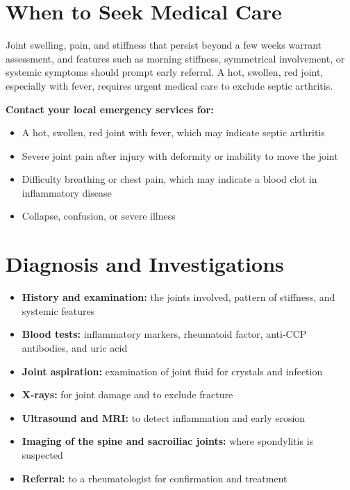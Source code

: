 \section*{When to Seek Medical Care}
Joint swelling, pain, and stiffness that persist beyond a few weeks warrant assessment, and features such as morning stiffness, symmetrical involvement, or systemic symptoms should prompt early referral. A hot, swollen, red joint, especially with fever, requires urgent medical care to exclude septic arthritis.

\textbf{Contact your local emergency services for:}
\begin{itemize}
    \item A hot, swollen, red joint with fever, which may indicate septic arthritis
    \item Severe joint pain after injury with deformity or inability to move the joint
    \item Difficulty breathing or chest pain, which may indicate a blood clot in inflammatory disease
    \item Collapse, confusion, or severe illness
\end{itemize}

\section*{Diagnosis and Investigations}
\begin{itemize}
    \item \textbf{History and examination:} the joints involved, pattern of stiffness, and systemic features
    \item \textbf{Blood tests:} inflammatory markers, rheumatoid factor, anti-CCP antibodies, and uric acid
    \item \textbf{Joint aspiration:} examination of joint fluid for crystals and infection
    \item \textbf{X-rays:} for joint damage and to exclude fracture
    \item \textbf{Ultrasound and MRI:} to detect inflammation and early erosion
    \item \textbf{Imaging of the spine and sacroiliac joints:} where spondylitis is suspected
    \item \textbf{Referral:} to a rheumatologist for confirmation and treatment
\end{itemize}


